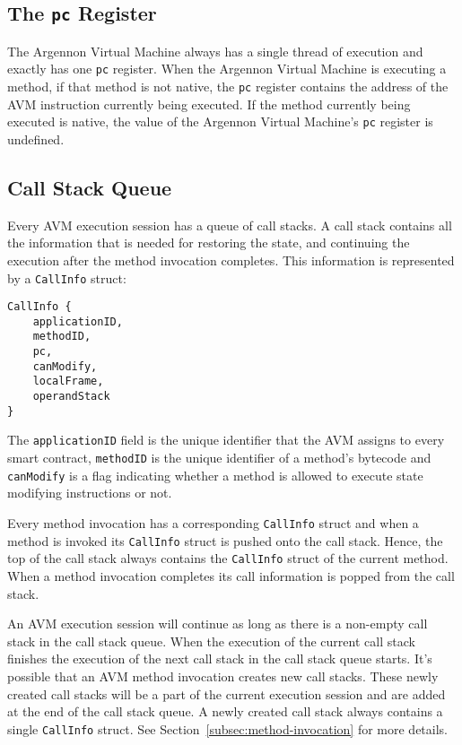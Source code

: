 \documentclass[11pt, a4paper]{report}
\begin{document}
    \subsection{The \texttt{pc} Register}\label{subsec:the-pc-register}

    The Argennon Virtual Machine always has a single thread of execution and exactly has one \texttt{pc} register.
    When the Argennon Virtual Machine is executing a method, if that method is not native, the \texttt{pc} register
    contains the address of the AVM instruction currently being executed. If the method currently being executed
    is native, the value of the Argennon Virtual Machine's \texttt{pc} register is undefined.

    \subsection{Call Stack Queue}\label{subsec:call-stack}

    Every AVM execution session has a queue of call stacks. A call stack contains all the information that is needed for
    restoring the state, and continuing the execution after the method invocation completes.
    This information is represented by a \texttt{CallInfo} struct:
    \begin{verbatim}
CallInfo {
    applicationID,
    methodID,
    pc,
    canModify,
    localFrame,
    operandStack
}
    \end{verbatim}
    The \texttt{applicationID} field is the unique identifier that the AVM assigns to every smart contract,
    \texttt{methodID} is the unique identifier of a method's bytecode and \texttt{canModify} is a flag
    indicating whether a method is allowed to execute state modifying instructions or not.

    Every method invocation has a corresponding \texttt{CallInfo} struct and when a method is invoked its
    \texttt{CallInfo} struct is pushed onto the call stack. Hence, the top of the call stack always contains
    the \texttt{CallInfo} struct of the current method. When a method invocation completes its call
    information is popped from the call stack.

    An AVM execution session will continue as long as there is a non-empty call stack in the call stack queue. When the
    execution of the current call stack finishes the execution of the next call stack in the call stack queue starts.
    It's possible that an AVM method invocation creates new call stacks. These newly created call stacks will be a part
    of the current execution session and are added at the end of the call stack queue. A newly created call stack always
    contains a single \texttt{CallInfo} struct. See Section~\ref{subsec:method-invocation} for more details.
\end{document}
